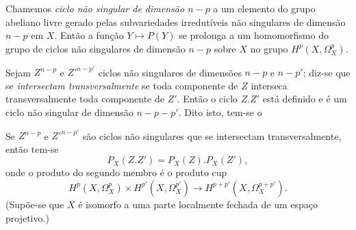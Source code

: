 Chamemos \emph{ciclo não singular de dimensão $n-p$} a um elemento do grupo
abeliano livre gerado pelas subvariedades irredutíveis não singulares de
dimensão $n-p$ em $X$. Então a função $Y\longmapsto P(Y)$ se prolonga a
um homomorfismo do grupo de ciclos não singulares de dimensão $n-p$ sobre $X$
no grupo $H^{p}(X,\Omega_X^{p})$.

Sejam $Z^{n-p}$ e $Z'^{n-p'}$ ciclos não singulares de dimensões $n-p$ e
$n-p'$; diz-se que se \emph{intersectam transversalmente} se toda componente
de $Z$ interseca transversalmente toda componente de $Z'$. Então o ciclo $Z.Z'$ está
definido e é um ciclo não singular de dimensão $n-p-p'$. Dito isto, tem-se o

 Se $Z^{n-p}$ e $Z'^{n-p'}$ são ciclos não singulares
que se intersectam transversalmente, então tem-se
\begin{equation}\tag{4.4}
  P_X(Z.Z')=P_X(Z).P_X(Z'),
\end{equation}
onde o produto do segundo membro é o produto cup
\[
  H^{p}(X,\Omega_X^{p})\times H^{p'}(X,\Omega_X^{p'})
  \longrightarrow H^{p+p'}(X,\Omega_X^{p+p'}).
\]
(Supõe-se que $X$ é isomorfo a uma parte localmente fechada de um espaço
projetivo.)

